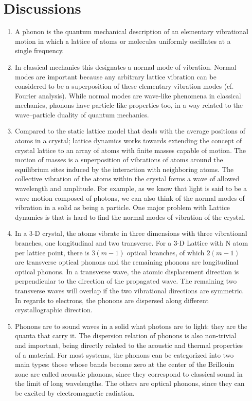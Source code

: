 \documentclass[%
 aip,
 amsmath,amssymb,
 reprint, floatfix%
]{revtex4-1}
\begin{document}
\section{Discussions}
    \begin{enumerate}
        \item A phonon is the quantum mechanical description of an elementary vibrational motion in which a lattice of atoms or molecules uniformly oscillates at a single frequency.
        \item In classical mechanics this designates a normal mode of vibration. Normal modes are important because any arbitrary lattice vibration can be considered to be a superposition of these elementary vibration modes (cf. Fourier analysis). While normal modes are wave-like phenomena in classical mechanics, phonons have particle-like properties too, in a way related to the wave–particle duality of quantum mechanics.
        \item Compared to the static lattice model that deals with the average positions of atoms in a crystal; lattice dynamics works towards extending the concept of crystal lattice to an array of atoms with finite masses capable of motion. The motion of masses is a superposition of vibrations of atoms around the equilibrium sites induced by the interaction with neighboring atoms. The collective vibration of the atoms within the crystal forms a wave of allowed wavelength and amplitude. For example, as we know that light is said to be a wave motion composed of photons, we can also think of the normal modes of vibration in a solid as being a particle. One major problem with Lattice dynamics is that is hard to find the normal modes of vibration of the crystal.
        \item In a 3-D crystal, the atoms vibrate in three dimensions with three vibrational branches, one longitudinal and two transverse. For a 3-D Lattice with N atom per lattice point, there is $3(m-1)$ optical branches, of which $2(m-1)$ are transverse optical phonons and the remaining phonons are longitudinal optical phonons. In a transverse wave, the atomic displacement direction is perpendicular to the direction of the propagated wave. The remaining two transverse waves will overlap if the two vibrational directions are symmetric. In regards to electrons, the phonons are dispersed along different crystallographic direction.
        \item Phonons are to sound waves in a solid what photons are to light: they are the quanta that carry it. The dispersion relation of phonons is also non-trivial and important, being directly related to the acoustic and thermal properties of a material. For most systems, the phonons can be categorized into two main types: those whose bands become zero at the center of the Brillouin zone are called acoustic phonons, since they correspond to classical sound in the limit of long wavelengths. The others are optical phonons, since they can be excited by electromagnetic radiation. 

\end{enumerate}
\end{document}

